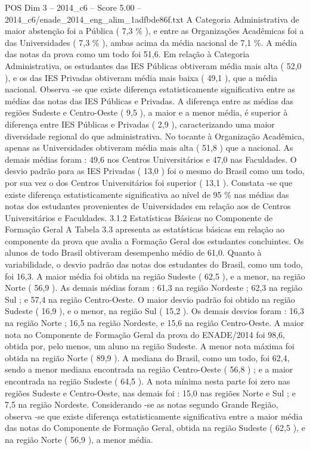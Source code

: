 \begin{textsample}{POS Dim 3 – 2014\_c6 – Score 5.00 – 2014\_c6/enade\_2014\_eng\_alim\_1adfbde86f.txt}
A Categoria Administrativa de maior abstenção foi a Pública ( 7,3 \% ), e entre as Organizações Acadêmicas foi a das Universidades ( 7,3 \% ), ambas acima da média nacional de 7,1 \%.
A média das notas da prova como um todo foi 51,6.
Em relação à Categoria Administrativa, os estudantes das IES Públicas obtiveram média mais alta ( 52,0 ), e os das IES Privadas obtiveram média mais baixa ( 49,1 ), que a média nacional.
Observa -se que existe diferença estatisticamente significativa entre as médias das notas das IES Públicas e Privadas.
A diferença entre as médias das regiões Sudeste e Centro-Oeste ( 9,5 ), a maior e a menor média, é superior à diferença entre IES Públicas e Privadas ( 2,9 ), caracterizando uma maior diversidade regional do que administrativa.
No tocante à Organização Acadêmica, apenas as Universidades obtiveram média mais alta ( 51,8 ) que a nacional.
As demais médias foram : 49,6 nos Centros Universitários e 47,0 nas Faculdades.
O desvio padrão para as IES Privadas ( 13,0 ) foi o mesmo do Brasil como um todo, por sua vez o dos Centros Universitários foi superior ( 13,1 ).
Constata -se que existe diferença estatisticamente significativa ao nível de 95 \% nas médias das notas dos estudantes provenientes de Universidades em relação aos de Centros Universitários e Faculdades. 3.1.2 Estatísticas Básicas no Componente de Formação Geral A Tabela 3.3 apresenta as estatísticas básicas em relação ao componente da prova que avalia a Formação Geral dos estudantes concluintes.
Os alunos de todo Brasil obtiveram desempenho médio de 61,0.
Quanto à variabilidade, o desvio padrão das notas dos estudantes do Brasil, como um todo, foi 16,3.
A maior média foi obtida na região Sudeste ( 62,5 ), e a menor, na região Norte ( 56,9 ).
As demais médias foram : 61,3 na região Nordeste ; 62,3 na região Sul ; e 57,4 na região Centro-Oeste.
O maior desvio padrão foi obtido na região Sudeste ( 16,9 ), e o menor, na região Sul ( 15,2 ).
Os demais desvios foram : 16,3 na região Norte ; 16,5 na região Nordeste, e 15,6 na região Centro-Oeste.
A maior nota no Componente de Formação Geral da prova do ENADE/2014 foi 98,6, obtida por, pelo menos, um aluno na região Sudeste.
A menor nota máxima foi obtida na região Norte ( 89,9 ).
A mediana do Brasil, como um todo, foi 62,4, sendo a menor mediana encontrada na região Centro-Oeste ( 56,8 ) ; e a maior encontrada na região Sudeste ( 64,5 ).
A nota mínima nesta parte foi zero nas regiões Sudeste e Centro-Oeste, nas demais foi : 15,0 nas regiões Norte e Sul ; e 7,5 na região Nordeste.
Considerando -se as notas segundo Grande Região, observa -se que existe diferença estatisticamente significativa entre a maior média das notas do Componente de Formação Geral, obtida na região Sudeste ( 62,5 ), e na região Norte ( 56,9 ), a menor média.

\end{textsample}
